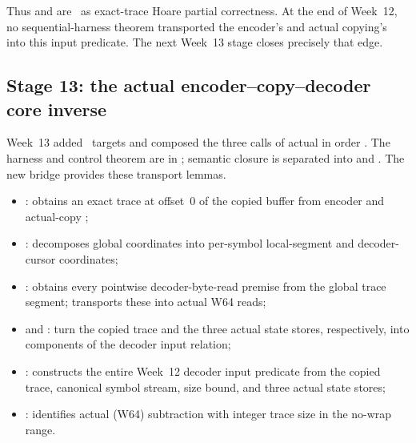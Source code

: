 Thus  and
 are \statusproved\ as exact-trace Hoare
partial correctness.
At the end of Week~12, no sequential-harness theorem transported the encoder's
 and actual copying's 
into this input predicate. The next Week~13 stage closes precisely that edge.

\subsection{Stage 13: the actual encoder--copy--decoder core inverse}

Week~13 added \WeekThirteenTargetCount\ targets and composed the three calls
of actual  in order
\cite{week13-report,rans-core-composition}.
The harness and control theorem are in ;
semantic closure is separated into
 and
.
The new bridge provides these transport lemmas.

\begin{itemize}
  \item {}: obtains an exact trace at
        offset~0 of the copied buffer from encoder
         and actual-copy ;
  \item {}: decomposes global
         coordinates into per-symbol local-segment
        and decoder-cursor coordinates;
  \item {}:
        obtains every pointwise decoder-byte-read premise from the global trace
        segment; 
        transports these into actual W64 reads;
  \item {} and
        : turn the copied trace
        and the three actual state stores, respectively, into components of the
        decoder input relation;
  \item {}: constructs
        the entire Week~12 decoder input predicate from the copied trace,
        canonical symbol stream, size bound, and three actual state stores;
  \item {}: identifies actual
        (W64) subtraction with integer trace size in the no-wrap range.
\end{itemize}

